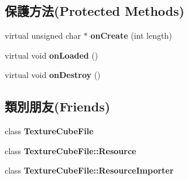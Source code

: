 \subsection*{保護方法(Protected Methods)}
\begin{DoxyCompactItemize}
\item 
virtual unsigned char $\ast$ {\bfseries on\+Create} (int length)\hypertarget{class_i_dream_sky_1_1_texture_cube_file_1_1_resource_a7fa11cd0fc9154d8b3a5078b93e415ad}{}\label{class_i_dream_sky_1_1_texture_cube_file_1_1_resource_a7fa11cd0fc9154d8b3a5078b93e415ad}

\item 
virtual void {\bfseries on\+Loaded} ()\hypertarget{class_i_dream_sky_1_1_texture_cube_file_1_1_resource_a16ae4b0c65da133f71570fa12ace5e4f}{}\label{class_i_dream_sky_1_1_texture_cube_file_1_1_resource_a16ae4b0c65da133f71570fa12ace5e4f}

\item 
virtual void {\bfseries on\+Destroy} ()\hypertarget{class_i_dream_sky_1_1_texture_cube_file_1_1_resource_aad4ab2be60d5e62223ed091f934a557e}{}\label{class_i_dream_sky_1_1_texture_cube_file_1_1_resource_aad4ab2be60d5e62223ed091f934a557e}

\end{DoxyCompactItemize}
\subsection*{類別朋友(Friends)}
\begin{DoxyCompactItemize}
\item 
class {\bfseries Texture\+Cube\+File}\hypertarget{class_i_dream_sky_1_1_texture_cube_file_1_1_resource_a5a4cc7500bfedf34cfa4a8a270cc6c13}{}\label{class_i_dream_sky_1_1_texture_cube_file_1_1_resource_a5a4cc7500bfedf34cfa4a8a270cc6c13}

\item 
class {\bfseries Texture\+Cube\+File\+::\+Resource}\hypertarget{class_i_dream_sky_1_1_texture_cube_file_1_1_resource_a6dd29e2fc99c16ad18aa9e40e44dcc05}{}\label{class_i_dream_sky_1_1_texture_cube_file_1_1_resource_a6dd29e2fc99c16ad18aa9e40e44dcc05}

\item 
class {\bfseries Texture\+Cube\+File\+::\+Resource\+Importer}\hypertarget{class_i_dream_sky_1_1_texture_cube_file_1_1_resource_abd0103c9043c92f29b4a7e3fe219a646}{}\label{class_i_dream_sky_1_1_texture_cube_file_1_1_resource_abd0103c9043c92f29b4a7e3fe219a646}

\end{DoxyCompactItemize}
